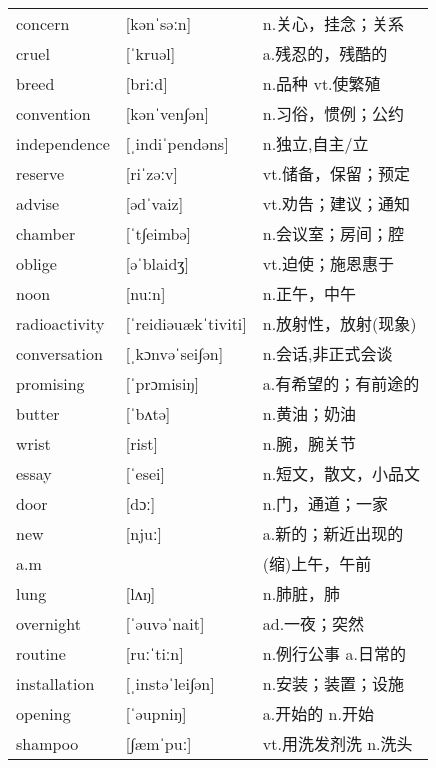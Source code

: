 \documentclass[a4paper]{article}
\begin{document}
\section{}
\begin{tabular}{l l l}

concern & [kənˈsəːn] & n.关心，挂念；关系 \\
cruel & [ˈkruəl] & a.残忍的，残酷的 \\
breed & [briːd] & n.品种 vt.使繁殖 \\
convention & [kənˈven∫ən] & n.习俗，惯例；公约 \\
independence & [ˌindiˈpendəns] & n.独立,自主/立 \\
reserve & [riˈzəːv] & vt.储备，保留；预定 \\
advise & [ədˈvaiz] & vt.劝告；建议；通知 \\
chamber & [ˈt∫eimbə] & n.会议室；房间；腔 \\
oblige & [əˈblaidʒ] & vt.迫使；施恩惠于 \\
noon & [nuːn] & n.正午，中午 \\
radioactivity & [ˈreidiəuækˈtiviti] & n.放射性，放射(现象) \\
conversation & [ˌkɔnvəˈsei∫ən] & n.会话,非正式会谈 \\
promising & [ˈprɔmisiŋ] & a.有希望的；有前途的 \\
butter & [ˈbʌtə] & n.黄油；奶油 \\
wrist & [rist] & n.腕，腕关节 \\
essay & [ˈesei] & n.短文，散文，小品文 \\
door & [dɔː] & n.门，通道；一家 \\
new & [njuː] & a.新的；新近出现的 \\
a.m &  & (缩)上午，午前 \\
lung & [lʌŋ] & n.肺脏，肺 \\
overnight & [ˈəuvəˈnait] & ad.一夜；突然 \\
routine & [ruːˈtiːn] & n.例行公事 a.日常的 \\
installation & [ˌinstəˈlei∫ən] & n.安装；装置；设施 \\
opening & [ˈəupniŋ] & a.开始的 n.开始 \\
shampoo & [∫æmˈpuː] & vt.用洗发剂洗 n.洗头 \\

\end{tabular}
\end{document}

